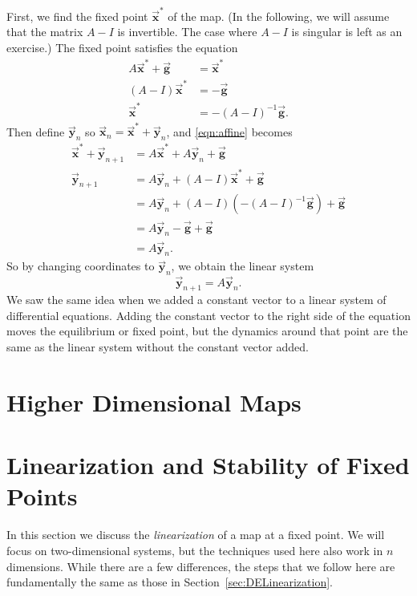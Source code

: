 \documentclass[reqno]{immbook}
\newcommand{\BG}{\vec{\textbf{g}}}
\newcommand{\BX}{\vec{\textbf{x}}}
\newcommand{\BY}{\vec{\textbf{y}}}
\begin{document}
First, we find the fixed point $\BX^*$ of the map.
(In the following, we will assume that 
the matrix $A-I$ is invertible.  The case
where $A-I$ is singular is left as an exercise.)
The fixed point satisfies the equation
\begin{equation}
\begin{split}
   A\BX^* + \BG & = \BX^* \\
   (A-I)\BX^* & = -\BG \\
       \BX^* & = -(A-I)^{-1}\BG.
\end{split}
\end{equation}
Then define $\BY_n$ so $\BX_n = \BX^* + \BY_n$,
and \eqref{eqn:affine} becomes
\begin{equation}
\begin{split}
  \BX^* + \BY_{n+1} & = A\BX^* + A\BY_n +\BG \\
  \BY_{n+1} & = A\BY_n + (A-I)\BX^* + \BG \\
            & = A\BY_n + (A-I)\left(-(A-I)^{-1}\BG\right)+\BG \\
	    & = A\BY_n -\BG+\BG \\
	    & = A\BY_n.
\end{split}
\end{equation}
So by changing coordinates to $\BY_n$, we obtain
the linear system
\begin{equation}
  \BY_{n+1} = A\BY_n .
\end{equation}
We saw the same idea when we added a constant vector to a
linear system of differential equations.
Adding the constant vector to the right side of the equation
moves the equilibrium or fixed point, but
the dynamics around that point are the same
as the linear system without the constant vector added.


\section{Higher Dimensional Maps}
%
\section{Linearization and Stability of Fixed Points}
%
In this section we discuss the \emph{linearization}
of a map at a fixed point. 
We will focus on two-dimensional systems, but the
techniques used here also work in $n$ dimensions.
While there are a few differences, the steps that
we follow here are fundamentally the same as those
in Section~\ref{sec:DELinearization}.
\end{document}
